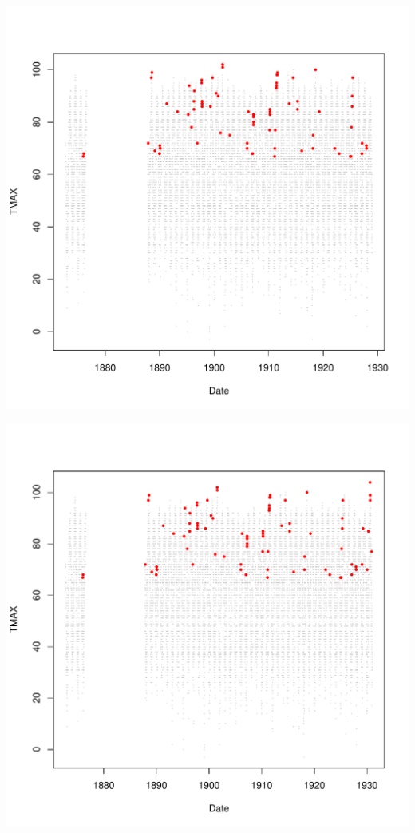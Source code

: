 \documentclass{article}\usepackage[]{graphicx}\usepackage[]{color}
\makeatletter
\def\maxwidth{ %
  \ifdim\Gin@nat@width>\linewidth
    \linewidth
  \else
    \Gin@nat@width
  \fi
}
\newenvironment{knitrout}{}{} %
\makeatother
\begin{document}
\begin{knitrout}
\includegraphics[width=\maxwidth]{figure/unnamed-chunk-4-24} 

\includegraphics[width=\maxwidth]{figure/unnamed-chunk-4-25} 


\end{knitrout}
\end{document}
